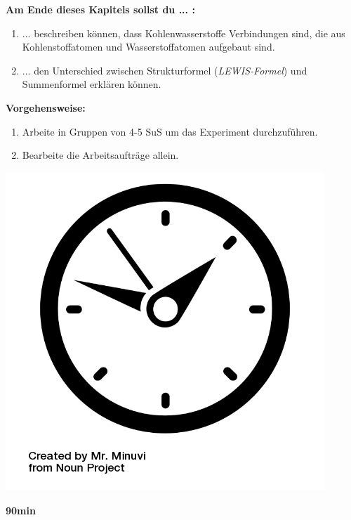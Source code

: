 \documentclass{scrartcl}  %
\begin{document}
\vspace{0.7cm}	
	\begin{minipage}{0.7\textwidth}
		\noindent \textbf{Am Ende dieses Kapitels sollst du ... :}
		\begin{enumerate}
			\item ... beschreiben können, dass Kohlenwasserstoffe Verbindungen sind, die aus Kohlenstoffatomen und Wasserstoffatomen aufgebaut sind.
			\item ... den Unterschied zwischen Strukturformel (\textit{LEWIS-Formel}) und Summenformel erklären können.
		\end{enumerate}
		\textbf{Vorgehensweise:}
		\begin{enumerate}
			\item Arbeite in Gruppen von 4-5 SuS um das Experiment durchzuführen.
			\item Bearbeite die Arbeitsaufträge allein.
		\end{enumerate}
			
	\end{minipage}
	\hspace{0.1\textwidth}
	\begin{minipage}{0.2\textwidth}
		\begin{tcolorbox}
			[enhanced,
			width=0.9\textwidth,
			colback=white,
			colframe=black,
			fonttitle=\sffamily\bfseries\large, 
			title=Zeit,  %
			attach boxed title to top center={xshift=-0.0mm,yshift=-0.50mm},
			boxed title style={skin=enhancedfirst jigsaw,size=small,arc=1mm,bottom=-1mm,colframe=black,height=0.75cm},
			colbacktitle=black,
			drop lifted shadow]
			\centering
			\includegraphics[width=0.9\textwidth]{../symbols/symbol_tex_time}
			
			\begin{center}
				\textbf{90min}
			\end{center}
		\end{tcolorbox}
	\end{minipage}
\end{document}
